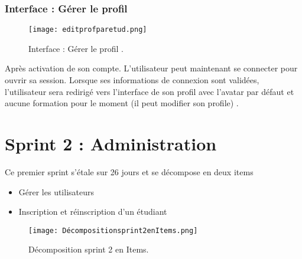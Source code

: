 \subsubsection{ Interface : Gérer le profil  }


\begin{figure}[ht]
	\centering
	\texttt{[image: editprofparetud.png]}
	\caption{Interface : Gérer le profil .}
	\label{fig:Interface : Gérer le profi }
\end{figure}
\FloatBarrier
Après activation de son compte. L’utilisateur peut maintenant se connecter pour ouvrir sa session.
Lorsque ses informations de connexion sont validées, l’utilisateur sera redirigé vers
l’interface de son profil avec l’avatar par défaut et aucune formation pour le moment (il peut modifier son profile) .


\clearpage



\section{Sprint 2 : Administration }



\begin{fquote}
Ce premier sprint s’étale sur 26 jours et se décompose en deux items \end{fquote}
\smallskip
\begin{itemize}[label=$\diamond$]
	\item Gérer les utilisateurs
    \item  Inscription et réinscription d'un étudiant
	
\end{itemize}
\medskip
\medskip
\medskip
\medskip
\medskip
\medskip
\medskip
\medskip
\medskip
\medskip
\medskip
\begin{figure}[ht]
	\centering
	\texttt{[image: Décompositionsprint2enItems.png]}
	\caption{Décomposition sprint 2 en Items.}
	\label{fig:Décomposition sprint 2 en Items}
\end{figure}
\FloatBarrier
\clearpage





